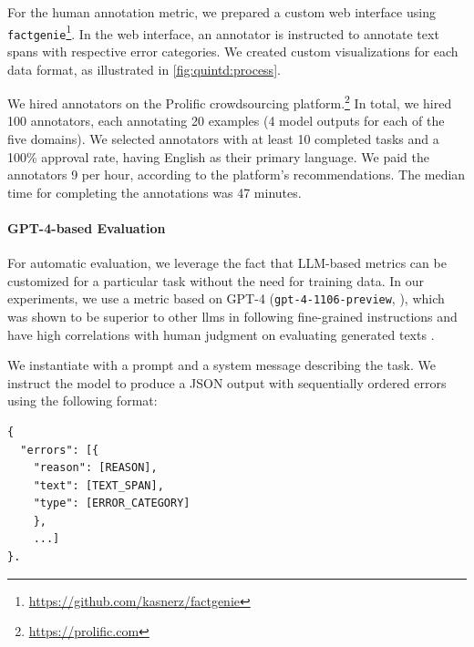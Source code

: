 
For the human annotation metric, we prepared a custom web interface using \texttt{factgenie}\footnote{\url{https://github.com/kasnerz/factgenie}}. In the web interface, an annotator is instructed to annotate text spans with respective error categories. We created custom visualizations for each data format, as illustrated in \autoref{fig:quintd:process}.

We hired annotators on the Prolific crowdsourcing platform.\footnote{\url{https://prolific.com}} In total, we hired 100 annotators, each annotating 20 examples (4 model outputs for each of the five domains). We selected annotators with at least 10 completed tasks and a 100\% approval rate, having English as their primary language. We paid the annotators \textsterling{}9 per hour, according to the platform's recommendations. The median time for completing the annotations was 47 minutes.




\paragraph{GPT-4-based Evaluation}
\label{sec:quintd:gpt4eval}

For automatic evaluation, we leverage the fact that LLM-based metrics can be customized for a particular task without the need for training data. In our experiments, we use a metric based on GPT-4 (\texttt{gpt-4-1106-preview}, \citealp{openai2023gpt4}), which was shown to be superior to other \acp{llm} in following fine-grained instructions and have high correlations with human judgment on evaluating generated texts \cite{zhaoInvestigatingTabletoTextGeneration2023,sottanaEvaluationMetricsEra2023,kocmiGEMBAMQMDetectingTranslation2023,kocmiLargeLanguageModels2023}.

We instantiate \gptmetric{} with a prompt and a system message describing the task. We instruct the model to produce a JSON output with sequentially ordered errors using the following format:

\small
\begin{verbatim}
{
  "errors": [{
    "reason": [REASON],
    "text": [TEXT_SPAN],
    "type": [ERROR_CATEGORY]
    }, 
    ...]
}.
\end{verbatim}
\normalsize



